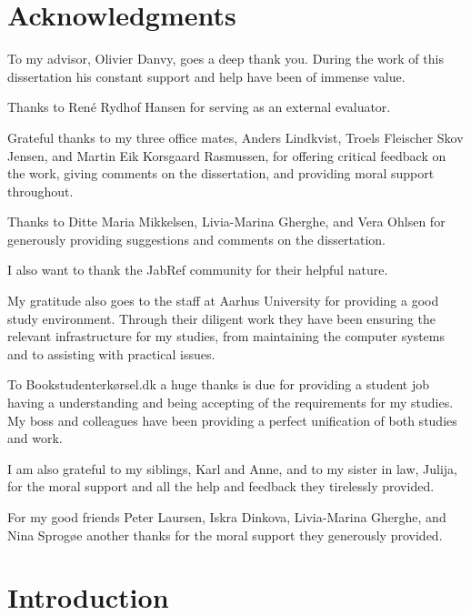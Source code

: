 \documentclass[twoside,11pt,openright,a4paper]{report}
\begin{document}
\chapter*{Acknowledgments}

To my advisor, Olivier Danvy, goes a deep thank you.  During the work
of this dissertation his constant support and help have been of
immense value.

Thanks to René Rydhof Hansen for serving as an external evaluator.

Grateful thanks to my three office mates, Anders Lindkvist, Troels
Fleischer Skov Jensen, and Martin Eik Korsgaard Rasmussen, for
offering critical feedback on the work, giving comments on the
dissertation, and providing moral support throughout.

Thanks to Ditte Maria Mikkelsen, Livia-Marina Gherghe, and Vera Ohlsen
for generously providing suggestions and comments on the dissertation.

I also want to thank the JabRef community for their helpful nature.

My gratitude also goes to the staff at Aarhus University for providing
a good study environment.  Through their diligent work they have been
ensuring the relevant infrastructure for my studies, from maintaining
the computer systems and to assisting with practical issues.

To Bookstudenterkørsel.dk a huge thanks is due for providing a student
job having a understanding and being accepting of the requirements for
my studies.  My boss and colleagues have been providing a perfect
unification of both studies and work.

I am also grateful to my siblings, Karl and Anne, and to my sister in
law, Julija, for the moral support and all the help and feedback they
tirelessly provided.

For my good friends Peter Laursen, Iskra Dinkova, Livia-Marina
Gherghe, and Nina Sprogøe another thanks for the moral support they
generously provided.


\tableofcontents
\newpage

\setcounter{secnumdepth}{2}


\chapter{Introduction}
\label{ch:intro}

\end{document}
